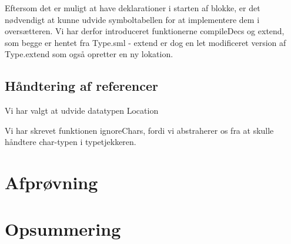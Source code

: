 \documentclass[10pt,a4paper,danish]{article}
\begin{document}
Eftersom det er muligt at have deklarationer i starten af blokke, er det 
nødvendigt at kunne udvide symboltabellen for at implementere dem i 
oversætteren. Vi har derfor introduceret funktionerne compileDecs og 
extend, som begge er hentet fra Type.sml - extend er dog 
en let modificeret version af Type.extend  som også
opretter en ny lokation.  

\subsection{Håndtering af referencer}
Vi har valgt at udvide datatypen Location 

Vi har skrevet funktionen ignoreChars, fordi vi abstraherer os fra at skulle 
håndtere char-typen i typetjekkeren.    

\section{Afprøvning}

\section{Opsummering}
\end{document}
